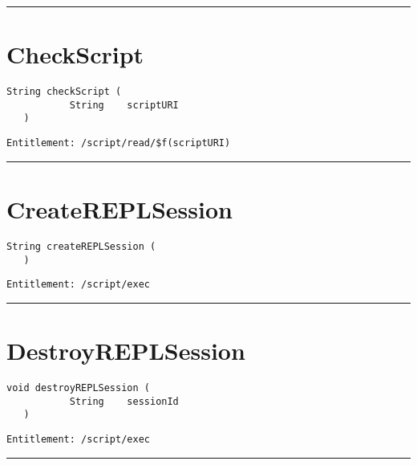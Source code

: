 \rule{12cm}{2pt}
\section{CheckScript}
\label{Api:CheckScript}
\begin{lstlisting}[style=nonumbers]
   String checkScript (
           String    scriptURI
   )
\end{lstlisting}
\begin{Verbatim}[formatcom=\color{Maroon}]
  Entitlement: /script/read/$f(scriptURI)
\end{Verbatim}



\rule{12cm}{2pt}
\section{CreateREPLSession}
\label{Api:CreateREPLSession}
\begin{lstlisting}[style=nonumbers]
   String createREPLSession (
   )
\end{lstlisting}
\begin{Verbatim}[formatcom=\color{Maroon}]
  Entitlement: /script/exec
\end{Verbatim}



\rule{12cm}{2pt}
\section{DestroyREPLSession}
\label{Api:DestroyREPLSession}
\begin{lstlisting}[style=nonumbers]
   void destroyREPLSession (
           String    sessionId
   )
\end{lstlisting}
\begin{Verbatim}[formatcom=\color{Maroon}]
  Entitlement: /script/exec
\end{Verbatim}



\rule{12cm}{2pt}
